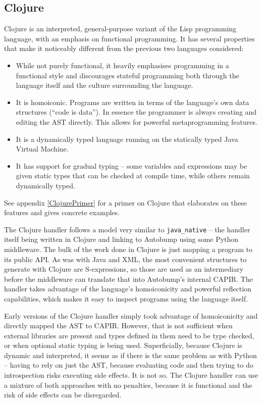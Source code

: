 \documentclass{l4proj}
\newcommand\genericstyle{\lstset{basicstyle=\ttm}}
\newcommand\codeinline[1]{{\genericstyle\lstinline!#1!}}
\begin{document}
\subsection{Clojure}
\label{Clojure}

Clojure is an interpreted, general-purpose variant of the Lisp
programming language, with an emphasis on functional programming. It
has several properties that make it noticeably different from the
previous two languages considered:

\begin{itemize}
\item While not purely functional, it heavily emphasises programming
in a functional style and discourages stateful programming both through the
language itself and the culture surrounding the language.
\item It is homoiconic. Programs are written in terms of the
language's own data structures (``code is data''). In essence the
programmer is always creating and editing the AST directly. This
allows for powerful metaprogramming features.
\item It is a dynamically typed language running on the statically
typed Java Virtual Machine.
\item It has support for gradual typing --
some variables and expressions may be given static types that can be
checked at compile time, while others remain dynamically typed.
\end{itemize}

See appendix \ref{ClojurePrimer} for a primer on Clojure that
elaborates on these features and gives concrete examples.

The Clojure handler follows a model very similar to \codeinline{java_native}
-- the handler itself being written in Clojure and linking to Autobump
using some Python middleware. The bulk of the work done in Clojure is
just mapping a program to its public API. As was with Java and XML,
the most convenient structures to generate with Clojure are
S-expressions, so those are used as an intermediary before the
middleware can translate that into Autobump's internal CAPIR. The
handler takes advantage of the language's homoiconicity and powerful
reflection capabilities, which makes it easy to inspect programs using
the language itself.

Early versions of the Clojure handler simply took advantage of
homoiconicity and directly mapped the AST to CAPIR. However, that is
not sufficient when external libraries are present and types defined
in them need to be type checked, or when optional static typing is being used.
Superficially, because Clojure is dynamic and interpreted, it seems as
if there is the same problem as with Python -- having to
rely on just the AST, because evaluating code and then trying to do
introspection risks executing side effects. It is not so. The Clojure
handler can use a mixture of both approaches with no penalties,
because it is functional and the risk of side effects can be disregarded.
\end{document}
